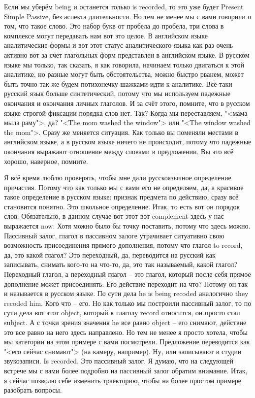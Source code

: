 \documentclass[main.tex]{subfiles}
\begin{document}
Если мы уберём being и останется только is recorded, то это уже будет Present Simple Passive, без аспекта длительности.
Но тем не менее мы с вами говорили о том, что такое слово.
Это набор букв от пробела до пробела, три слова в комплексе могут передавать нам вот это целое.
В английском языке аналитические формы и вот этот статус аналитического языка как раз очень активно вот за счет глагольных форм представлен в английском языке.
В русском языке мы только, так сказать, я как говорила, начинаем только двигаться к этой аналитике, но разные могут быть обстоятельства, можно быстро рванем, может быть точно так же будем потихонечку шажками идти к аналитике.
Всё-таки русский язык больше синтетический, потому что мы используем падежные окончания и окончания личных глаголов.
И за счёт этого, помните, что в русском языке строгой фиксации порядка слов нет.
Так?
Когда мы переставляем, "<мама мыла раму">, да?
"<The mom washed the window"> или "<The window washed the mom">.
Сразу же меняется ситуация.
Как только вы поменяли местами в английском языке, а в русском языке ничего не происходит, потому что падежные окончания выражают отношение между словами в предложении.
Вы это всё хорошо, наверное, помните.

Я всё время люблю проверять, чтобы мне дали русскоязычное определение причастия.
Потому что как только мы с вами его не определяем, да, а красивое такое определение в русском языке: признак предмета по действию, сразу всё становится понятно.
Это школьное определение.
Итак, то есть вот он порядок слов.
Обязательно, в данном случае вот этот вот complement здесь у нас выражается now.
Хотя можно было бы точку поставить, потому что здесь можно.
Пассивный залог, глагол в пассивном залоге утрачивает ситуативно свою возможность присоединения прямого дополнения, потому что глагол to record, да, это какой глагол?
Это переходный, да, переводится на русский как записывать, снимать кого-то на что-то, да, это так называемый, какой глагол?
Переходный глагол, а переходный глагол -- это глагол, который после себя прямое дополнение может присоединять.
Его действие переходит на что? Потому он так и называется в русском языке.
По сути дела he is being recoded аналогично they recoded him.
Кого что -- его.
Но как только мы построили пассивный залог, то по сути дела вот этот object, который к глаголу record относится, он просто стал subject.
А с точки зрения значения he все равно object -- его снимают, действие это все равно на него здесь направлено.
Но тем не менее я просто хотела, чтобы мы категории на этом примере с вами посмотрели.
Предложение переводится как "<его сейчас снимают"> (на камеру, например).
Ну, или записывают в студии звукозаписи.
Is recorded.
Это пассивный залог.
Я думаю, что на следующей встрече мы с вами более подробно на пассивный залог обратим внимание.
Итак, я сейчас позволю себе изменить траекторию, чтобы на более простом примере разобрать вопросы.
\end{document}

